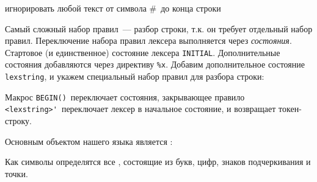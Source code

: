 
игнорировать любой текст от символа \#\ до конца строки

Самый сложный набор правил\ --- разбор строки, т.к. он требует отдельный
набор правил. Переключение набора правил лексера выполняется через
\emph{состояния}. Стартовое (и единственное) состояние лексера \verb|INITIAL|.
Дополнительные состояния добавляются через директиву \verb|%x|. Добавим 
дополнительное состояние \verb|lexstring|, и укажем специальный набор правил
для разбора строки:


Макрос \verb|BEGIN()|\ переключает состояния, закрывающее правило
\verb|<lexstring>'|\ переключает лексер в начальное состояние, и возвращает
токен-строку.

Основным объектом нашего языка является :


Как символы определятся все , состоящие из букв,
цифр, знаков подчеркивания и точки.



\secup

\clearpage
{}
\printindex

